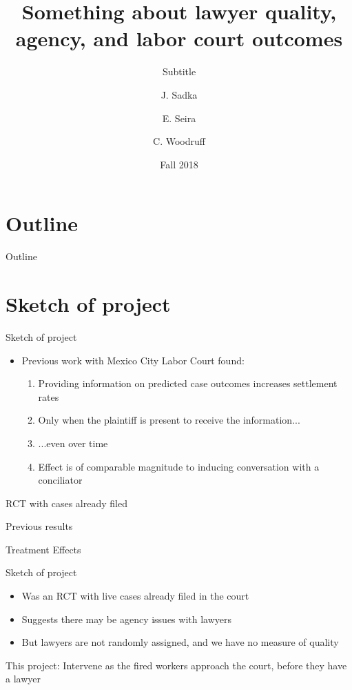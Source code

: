 \documentclass[8pt]{beamer}
\title{Something about lawyer quality, agency, and labor court outcomes }
\subtitle{Subtitle}
\author{J. Sadka\inst{1} \and E. Seira\inst{2} \and C. Woodruff\inst{3}}
\institute[ITAM, Oxford] %
{
  \inst{1,2}%
  ITAM
  \and
  \inst{3}%
  Oxford
}
\date{Fall 2018}
\begin{document}
\begin{frame}
  \titlepage
\end{frame}

\section*{Outline}
\begin{frame}{Outline}
\tableofcontents
\end{frame}

\section{Sketch of project}
\begin{frame}{Sketch of project}
\begin{itemize}
    \item Previous work with Mexico City Labor Court found:
    \begin{enumerate}
        \item Providing information on predicted case outcomes increases settlement rates
        \item Only when the plaintiff is present to receive the information...
        \item ...even over time
        \item Effect is of comparable magnitude to inducing conversation with a conciliator
    \end{enumerate}
\end{itemize}

RCT with cases already filed

\end{frame}


\begin{frame}{Previous results}

\begin{table}[H]
    \caption{Treatment Effects}
    \label{Treatment_effects}
    \begin{center}
    \scriptsize{}
    \end{center}
\end{table}


\end{frame}

\begin{frame}{Sketch of project}
\begin{itemize}
    \item Was an RCT with live cases already filed in the court
   \item Suggests there may be agency issues with lawyers
  \item But lawyers are not randomly assigned, and we have no measure of quality
\end{itemize}

This project: Intervene as the fired workers approach the court, before they have a lawyer
 \end{frame}
 
\end{document}
